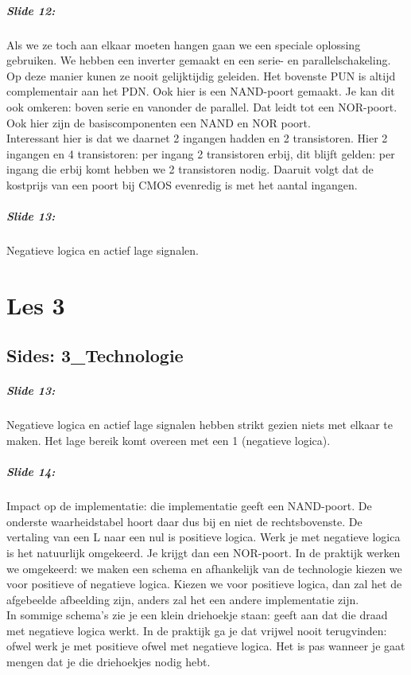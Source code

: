\documentclass[10pt,a4paper]{book}
\begin{document}
\paragraph{Slide 12:} Als we ze toch aan elkaar moeten hangen gaan we een speciale oplossing gebruiken.  We hebben een inverter gemaakt en een serie- en parallelschakeling. Op deze manier kunen ze nooit gelijktijdig geleiden. Het bovenste PUN is altijd complementair aan het PDN. Ook hier is een NAND-poort gemaakt. Je kan dit ook omkeren: boven serie en vanonder de parallel. Dat leidt tot een NOR-poort. Ook hier zijn de basiscomponenten een NAND en NOR  poort.\\
Interessant hier is dat we daarnet 2 ingangen hadden en 2 transistoren. Hier 2 ingangen en 4 transistoren: per ingang 2 transistoren erbij, dit blijft gelden: per ingang die erbij komt hebben we 2 transistoren nodig. Daaruit volgt dat de kostprijs van een poort bij CMOS evenredig is met het aantal ingangen.

\paragraph{Slide 13:} Negatieve logica en actief lage signalen.

\chapter{Les 3}

\section{Sides: 3\_Technologie}

\paragraph{Slide 13:} Negatieve logica en actief lage signalen hebben strikt gezien niets met elkaar te maken. Het lage bereik komt overeen met een 1 (negatieve logica).

\paragraph{Slide 14:} Impact op de implementatie: die implementatie geeft een NAND-poort. De onderste waarheidstabel hoort daar dus bij en niet de rechtsbovenste. De vertaling van een L naar een nul is positieve logica. Werk je met negatieve logica is het natuurlijk omgekeerd. Je krijgt dan een NOR-poort. In de praktijk werken we omgekeerd: we maken een schema en afhankelijk van de technologie kiezen we voor positieve of negatieve logica. Kiezen we voor positieve logica, dan zal het de afgebeelde afbeelding zijn, anders zal het een andere implementatie zijn.\\
In sommige schema's zie je een klein driehoekje staan: geeft aan dat die draad met negatieve logica werkt. In de praktijk ga je dat vrijwel nooit terugvinden: ofwel werk je met positieve ofwel met negatieve logica. Het is pas wanneer je gaat mengen dat je die driehoekjes nodig hebt.
\end{document}
